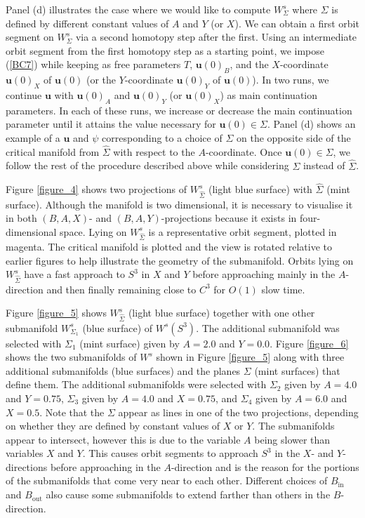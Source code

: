 \documentclass{ws-ijbc}
\begin{document}
Panel (d) illustrates the case where we would like to compute $W^{s}_{\Sigma}$ where $\Sigma$ is defined by different constant values of $A$ and $Y$ (or $X$).  We can obtain a first orbit segment on $W^{s}_{\Sigma}$ via a second homotopy step after the first.  Using an intermediate orbit segment from the first homotopy step as a starting point, we impose (\ref{BC7}) while keeping as free parameters $T$, $\mathbf{u}(0)_B$, and the $X$-coordinate $\mathbf{u}(0)_X$ of $\mathbf{u}(0)$ (or the $Y$-coordinate  $\mathbf{u}(0)_Y$ of $\mathbf{u}(0)$).  In two runs, we continue $\mathbf{u}$ with $\mathbf{u}(0)_A$ and $\mathbf{u}(0)_Y$ (or $\mathbf{u}(0)_X$) as main continuation parameters.  In each of these runs, we increase or decrease the main continuation parameter until it attains the value necessary for $\mathbf{u}(0) \in \Sigma$.  Panel (d) shows an example of a $\mathbf{u}$ and $\psi$ corresponding to a choice of $\Sigma$ on the opposite side of the critical manifold from $\widehat{\Sigma}$ with respect to the $A$-coordinate.  Once $\mathbf{u}(0) \in \Sigma$, we follow the rest of the procedure described above while considering $\Sigma$ instead of $\widehat{\Sigma}$.

Figure \ref{figure_4} shows two projections of $W^s_{\widehat{\Sigma}}$ (light blue surface) with $\widehat{\Sigma}$ (mint surface).  Although the manifold is two dimensional, it is necessary to visualise it in both $(B,A,X)$- and $(B,A,Y)$-projections because it exists in four-dimensional space.  Lying on $W^s_{\widehat{\Sigma}}$ is a representative orbit segment, plotted in magenta.  The critical manifold is plotted and the view is rotated relative to earlier figures to help illustrate the geometry of the submanifold.  Orbits lying on $W^s_{\widehat{\Sigma}}$ have a fast approach to $S^3$ in $X$ and $Y$ before approaching mainly in the $A$-direction and then finally remaining close to $C^3$ for $O(1)$ slow time.

Figure \ref{figure_5} shows $W^s_{\widehat{\Sigma}}$ (light blue surface) together with one other submanifold $W^{s}_{\Sigma_1}$ (blue surface) of $W^{s}(S^3)$.  The additional submanifold was selected with $\Sigma_1$ (mint surface) given by $A=2.0$ and $Y=0.0$.  Figure \ref{figure_6} shows the two submanifolds of $W^{s}$ shown in Figure \ref{figure_5} along with three additional submanifolds (blue surfaces) and the planes $\Sigma$ (mint surfaces) that define them.  The additional submanifolds were selected with $\Sigma_2$ given by $A=4.0$ and $Y=0.75$, $\Sigma_3$ given by $A=4.0$ and $X=0.75$, and $\Sigma_4$ given by $A=6.0$ and $X=0.5$.  Note that the $\Sigma$ appear as lines in one of the two projections, depending on whether they are defined by constant values of $X$ or $Y$.  The submanifolds appear to intersect, however this is due to the variable $A$ being slower than variables $X$ and $Y$.  This causes orbit segments to approach $S^3$ in the $X$- and $Y$-directions before approaching in the $A$-direction and is the reason for the portions of the submanifolds that come very near to each other.  Different choices of $B_{\text{in}}$ and $B_{\text{out}}$ also cause some submanifolds to extend farther than others in the $B$-direction.
\end{document}

